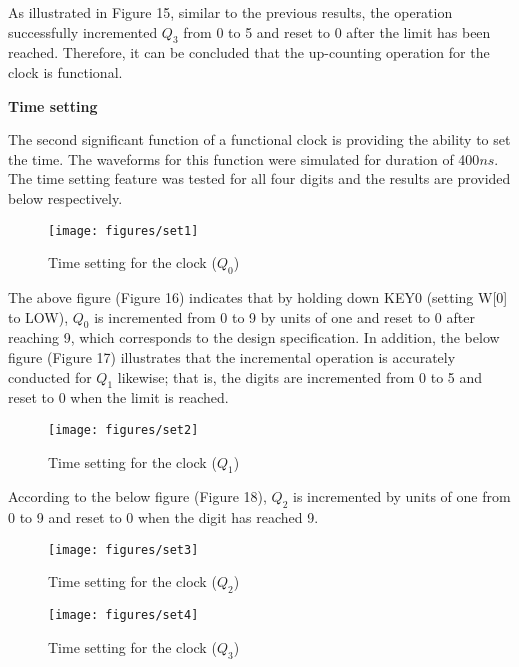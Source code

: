 \documentclass[12pt,a4paper]{article}
\begin{document}
	\noindent As illustrated in Figure 15, similar to the previous results, the operation successfully incremented $Q_{3}$ from 0 to 5 and reset to 0 after the limit has been reached. Therefore, it can be concluded that the up-counting operation for the clock is functional. 

	
	\vspace{0.3cm}
	\noindent \textbf{Time setting}
	\vspace{0.2cm}
	
	\noindent The second significant function of a functional clock is providing the ability to set the time. The waveforms for this function were simulated for duration of 400$ns$. The time setting feature was tested for all four digits and the results are provided below respectively.
	
	\begin{figure}[H]
		\centering
		\texttt{[image: figures/set1]}
		\caption{Time setting for the clock ($Q_{0}$)}
	\end{figure}

	\noindent The above figure (Figure 16) indicates that by holding down KEY0 (setting W[0] to LOW), $Q_{0}$ is incremented from 0 to 9 by units of one and reset to 0 after reaching 9, which corresponds to the design specification. In addition, the below figure (Figure 17) illustrates that the incremental operation is accurately conducted for $Q_{1}$ likewise; that is, the digits are incremented from 0 to 5 and reset to 0 when the limit is reached.

	\begin{figure}[H]
		\centering
		\texttt{[image: figures/set2]}
		\caption{Time setting for the clock ($Q_{1}$)}
	\end{figure}

	\noindent According to the below figure (Figure 18), $Q_{2}$ is incremented by units of one from 0 to 9 and reset to 0 when the digit has reached 9. 

	\begin{figure}[H]
		\centering
		\texttt{[image: figures/set3]}
		\caption{Time setting for the clock ($Q_{2}$)}
	\end{figure}

	\begin{figure}[H]
		\centering
		\texttt{[image: figures/set4]}
		\caption{Time setting for the clock ($Q_{3}$)}
	\end{figure}
	
\end{document}
